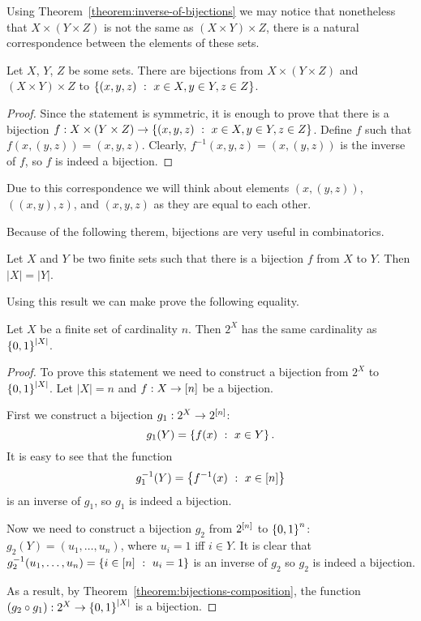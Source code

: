 Using Theorem~\ref{theorem:inverse-of-bijections} we may notice that
nonetheless that $X \times (Y \times Z)$ is not the same as
$(X \times Y) \times Z$, there is a natural correspondence between the elements
of these sets.
\begin{theorem}
    Let $X$, $Y$, $Z$ be some sets.
    There are bijections from $X \times (Y \times Z)$ and
    $(X \times Y) \times Z$ to $\set[x \in X, y \in Y, z \in Z]{(x, y, z)}$.
\end{theorem}
\begin{proof}
    Since the statement is symmetric, it is enough to prove that there is
    a bijection $f : X \times (Y \times Z) \to
    \set[x \in X, y \in Y, z \in Z]{(x, y, z)}$. Define $f$ such that
    $f(x, (y, z)) = (x, y, z)$.
    Clearly, $f^{-1}(x, y, z) = (x, (y, z))$ is the inverse of $f$, so $f$ is
    indeed a bijection.
\end{proof}
Due to this correspondence we will think about elements $(x, (y, z))$,
$((x, y), z)$, and $(x, y, z)$ as they are equal to each other.

Because of the following therem, bijections are very useful in combinatorics.
\begin{theorem}
\label{theorem:bijection-to-equality}
    Let $X$ and $Y$ be two finite sets such that there is a bijection $f$ from
    $X$ to $Y$. Then $|X| = |Y|$.
\end{theorem}

Using this result we can make prove the following equality.
\begin{corollary}
\label{corollary:power-set-and-set-of-binary-strings}
    Let $X$ be a finite set of cardinality $n$. Then $2^X$ has the same
    cardinality as $\set{0, 1}^{|X|}$.
\end{corollary}
\begin{proof}
    To prove this statement we need to construct a bijection from $2^X$ to
    $\set{0, 1}^{|X|}$. Let $|X| = n$ and $f : X \to {[{n}]}$ be a bijection.

    First we construct a bijection $g_1 : 2^X \to 2^{{[{n}]}}$:
    \[
        g_1(Y) = \set[x \in Y]{f(x)}.
    \]
    It is easy to see that the function
    \[
        g^{-1}_1(Y) = \set[{x \in \range{n}}]{f^{-1}(x)}
    \]
    is an inverse of $g_1$, so $g_1$ is indeed a bijection.

    Now we need to construct a bijection $g_2$ from $2^{{[{n}]}}$ to
    $\set{0, 1}^n$:
    $g_2(Y) = (u_1, \dots, u_n)$, where $u_i = 1$ iff $i \in Y$. It is clear
    that $g^{-1}_2(u_1, \dots, u_n) = \set[u_i = 1]{i \in \range{n}}$ is an
    inverse of $g_2$ so $g_2$ is indeed a bijection.

    As a result, by Theorem~\ref{theorem:bijections-composition}, the function
    $(g_2 \circ g_1) : 2^X \to \set{0, 1}^{|X|}$ is a bijection.
\end{proof}

